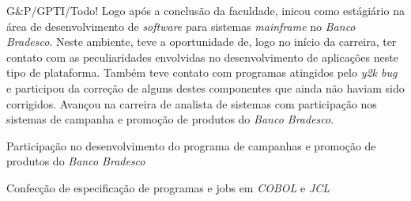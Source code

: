\begin{experience}[last]{G\&P/GPTI/Todo!}{
}
Logo após a conclusão da faculdade, inicou como estágiário na área de desenvolvimento
de \emph{software} para sistemas \emph{mainframe} no \emph{Banco Bradesco}. Neste
ambiente, teve a oportunidade de, logo no início da carreira, ter contato com as
peculiaridades envolvidas no desenvolvimento de aplicações neste tipo de plataforma.
Também teve contato com programas atingidos pelo \emph{y2k bug} e participou da correção
de alguns destes componentes que ainda não haviam sido corrigidos. Avançou na carreira de
analista de sistemas com participação nos sistemas de campanha e promoção de produtos
do \emph{Banco Bradesco}.
\\
\begin{contribs}
	\item{Participação no desenvolvimento do programa de campanhas
		e promoção de produtos do \emph{Banco Bradesco}}
	\item{Confecção de especificação de programas e jobs em \emph{COBOL} e \emph{JCL}}
\end{contribs}
\end{experience}

